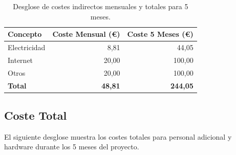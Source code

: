     \begin{table}[h!]
    \centering
    \begin{tabular}{lrr}
        \toprule
        \textbf{Concepto} & \textbf{Coste Mensual (€)} & \textbf{Coste 5 Meses (€)} \\
        \midrule
        Electricidad & 8,81 & 44,05 \\
        Internet & 20,00 & 100,00 \\
        Otros & 20,00 & 100,00 \\
        \textbf{Total} & \textbf{48,81} & \textbf{244,05} \\
        \bottomrule
    \end{tabular}
    \caption{Desglose de costes indirectos mensuales y totales para 5 meses.}
    \end{table}
    

    \subsection{Coste Total}

    El siguiente desglose muestra los costes totales para personal adicional y hardware durante los 5 meses del proyecto.
    

    \begin{table}[h!]
        \centering
        \caption{Coste total de personal, hardware y costes indirectos durante 5 meses.}
        \end{table}
            

